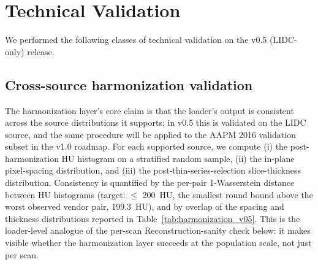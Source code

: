 \documentclass[twoside,11pt]{article}
\begin{document}
\section*{Technical Validation}

We performed the following classes of technical validation on the v0.5 (LIDC-only) release.

\subsection*{Cross-source harmonization validation}
The harmonization layer's core claim is that the loader's output is consistent across the source distributions it supports; in v0.5 this is validated on the LIDC source, and the same procedure will be applied to the AAPM 2016 validation subset in the v1.0 roadmap. For each supported source, we compute (i) the post-harmonization HU histogram on a stratified random sample, (ii) the in-plane pixel-spacing distribution, and (iii) the post-thin-series-selection slice-thickness distribution. Consistency is quantified by the per-pair 1-Wasserstein distance between HU histograms (target: $\leq$ 200~HU, the smallest round bound above the worst observed vendor pair, 199.3~HU), and by overlap of the spacing and thickness distributions reported in Table~\ref{tab:harmonization_v05}. This is the loader-level analogue of the per-scan Reconstruction-sanity check below: it makes visible whether the harmonization layer succeeds at the population scale, not just per scan.
\end{document}
